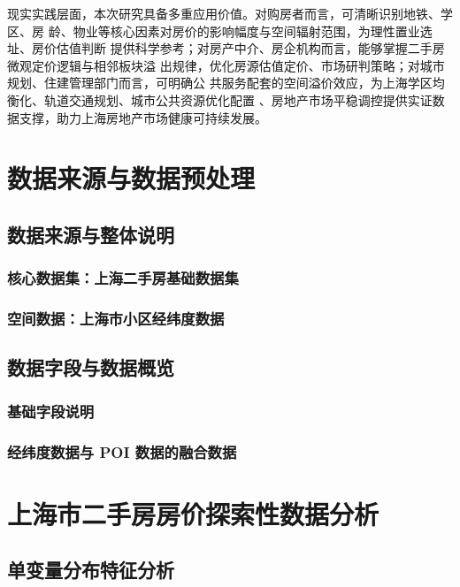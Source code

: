 \documentclass[UTF8]{ctexart}
\begin{document}
现实实践层面，本次研究具备多重应用价值。对购房者而言，可清晰识别地铁、学区、房
龄、物业等核心因素对房价的影响幅度与空间辐射范围，为理性置业选址、房价估值判断
提供科学参考；对房产中介、房企机构而言，能够掌握二手房微观定价逻辑与相邻板块溢
出规律，优化房源估值定价、市场研判策略；对城市规划、住建管理部门而言，可明确公
共服务配套的空间溢价效应，为上海学区均衡化、轨道交通规划、城市公共资源优化配置
、房地产市场平稳调控提供实证数据支撑，助力上海房地产市场健康可持续发展。

\section{数据来源与数据预处理}

\subsection{数据来源与整体说明} 

\subsubsection{核心数据集：上海二手房基础数据集} 

\subsubsection{空间数据：上海市小区经纬度数据} 

\subsection{数据字段与数据概览}

\subsubsection{基础字段说明} 

\subsubsection{经纬度数据与 POI 数据的融合数据} 

\section{上海市二手房房价探索性数据分析}

\subsection{单变量分布特征分析} 
\end{document}
